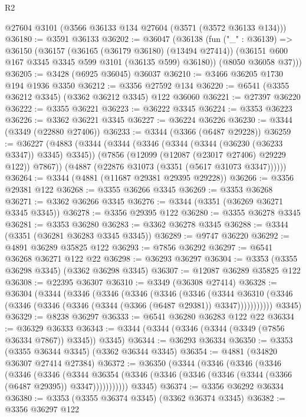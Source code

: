 \begin{lexlean}{R2}
\begin{coremodule}
    @27604
    @3101
    (@3566 @36133 @134 @27604 (@3571 (@3572 @36133 @134)))
@36180 := @3591 @36133
@36202 := @36047
    (@36138
      (fun ("_" : @36139) =>
      @36150
        (@36157
          (@36165 (@36179 @36180) (@13494 @27414))
          (@36151 @600 @167 @3345 @3345 @599 @3101 (@36135 @599) @36180))
        (@8050 @36058 @37)))
@36205 := @3428 (@6925 @36045) @36037
@36210 := @3466 @36205 @1730 @194 @1936 @3350
@36212 := @3356 @27592 @134
@36220 := @6541 (@3355 @36212 @3345) (@3362 @36212 @3345) @122 @36060
@36221 := @27397 @36220
@36222 := @3355 @36221
@36223 := @36222 @3345
@36224 := @3353 @36223
@36226 := @3362 @36221 @3345
@36227 := @36224 @36226
@36230 := @3344 (@3349 (@22880 @27406))
@36233 := @3344 (@3366 (@6487 @29228))
@36259 := @36227
    (@4883
      (@3344
        (@3344
          (@3346 (@3344 (@3344 (@36230 (@36233 @3347)) @3345) @3345))
          (@7856 (@12099 (@12087 (@23017 @27406) @29229 @122)) @7867))
        (@4887 (@22876 @31073 (@3351 (@5617 @31073 @3347))))))
@36264 := @3344 (@4881 (@11687 @29381 @29395 @29228))
@36266 := @3356 @29381 @122
@36268 := @3355 @36266 @3345
@36269 := @3353 @36268
@36271 := @3362 @36266 @3345
@36276 := @3344 (@3351 (@36269 @36271 @3345 @3345))
@36278 := @3356 @29395 @122
@36280 := @3355 @36278 @3345
@36281 := @3353 @36280
@36283 := @3362 @36278 @3345
@36288 := @3344 (@3351 (@36281 @36283 @3345 @3345))
@36289 := @9747 @36220
@36292 := @4891 @36289 @35825 @122
@36293 := @7856 @36292
@36297 := @6541 @36268 @36271 @122 @22
@36298 := @36293 @36297
@36304 := @3353 (@3355 @36298 @3345) (@3362 @36298 @3345)
@36307 := @12087 @36289 @35825 @122
@36308 := @22395 @36307
@36310 := @3349 (@36308 @27414)
@36328 := @36304
    (@3344
      (@3346
        (@3346
          (@3346
            (@3346
              (@3346
                (@3344
                  @36310
                  (@3346 (@3346 (@3346 (@3346 (@3344 (@3366 (@6487 @29381)) @3347)))))))))))
      @3345)
@36329 := @8238 @36297
@36333 := @6541 @36280 @36283 @122 @22
@36334 := @36329 @36333
@36343 := @3344 (@3344 (@3346 (@3344 (@3349 (@7856 @36334 @7867)) @3345)) @3345)
@36344 := @36293 @36334
@36350 := @3353 (@3355 @36344 @3345) (@3362 @36344 @3345)
@36354 := @4881 (@34820 @36307 @27414 @27384)
@36372 := @36350
    (@3344
      (@3346
        (@3346
          (@3346
            (@3346
              (@3346
                (@3344
                  @36354
                  (@3346 (@3346 (@3346 (@3346 (@3344 (@3366 (@6487 @29395)) @3347)))))))))))
      @3345)
@36374 := @3356 @36292 @36334
@36380 := @3353 (@3355 @36374 @3345) (@3362 @36374 @3345)
@36382 := @3356 @36297 @122

\end{coremodule}
\end{lexlean}
